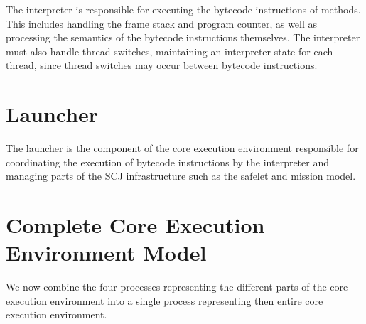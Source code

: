 The interpreter is responsible for executing the bytecode instructions
of methods.
This includes handling the frame stack and program counter, as well as
processing the semantics of the bytecode instructions themselves.
The interpreter must also handle thread switches, maintaining an
interpreter state for each thread, since thread switches may occur
between bytecode instructions.



\section{Launcher}
\label{cee-launcher-section}

The launcher is the component of the core execution environment
responsible for coordinating the execution of bytecode instructions by
the interpreter and managing parts of the SCJ infrastructure such as
the safelet and mission model.



\section{Complete Core Execution Environment Model}
\label{complete-cee-section}

We now combine the four \Circus{} processes representing the different
parts of the core execution environment into a single \Circus{}
process representing then entire core execution environment.

